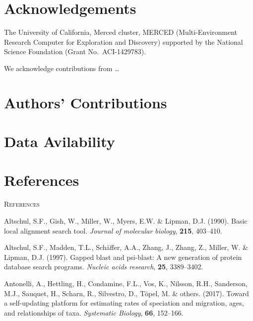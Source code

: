 \documentclass[]{article}
\begin{document}
\hypertarget{acknowledgements}{%
\section{Acknowledgements}\label{acknowledgements}}

The University of California, Merced cluster, MERCED (Multi-Environment Research Computer for Exploration and Discovery) supported by the National Science Foundation (Grant No.~ACI-1429783).

We acknowledge contributions from \ldots{}

\hypertarget{authors-contributions}{%
\section{Authors' Contributions}\label{authors-contributions}}

\hypertarget{data-avilability}{%
\section{Data Avilability}\label{data-avilability}}

\hypertarget{references}{%
\section{References}\label{references}}

\newpage
\begin{center}
\textsc{References}
\end{center}

\hypertarget{refs}{}
\leavevmode\hypertarget{ref-altschul1990basic}{}%
Altschul, S.F., Gish, W., Miller, W., Myers, E.W. \& Lipman, D.J. (1990). Basic local alignment search tool. \emph{Journal of molecular biology}, \textbf{215}, 403--410.

\leavevmode\hypertarget{ref-altschul1997gapped}{}%
Altschul, S.F., Madden, T.L., Schäffer, A.A., Zhang, J., Zhang, Z., Miller, W. \& Lipman, D.J. (1997). Gapped blast and psi-blast: A new generation of protein database search programs. \emph{Nucleic acids research}, \textbf{25}, 3389--3402.

\leavevmode\hypertarget{ref-antonelli2017toward}{}%
Antonelli, A., Hettling, H., Condamine, F.L., Vos, K., Nilsson, R.H., Sanderson, M.J., Sauquet, H., Scharn, R., Silvestro, D., Töpel, M. \& others. (2017). Toward a self-updating platform for estimating rates of speciation and migration, ages, and relationships of taxa. \emph{Systematic Biology}, \textbf{66}, 152--166.
\end{document}
